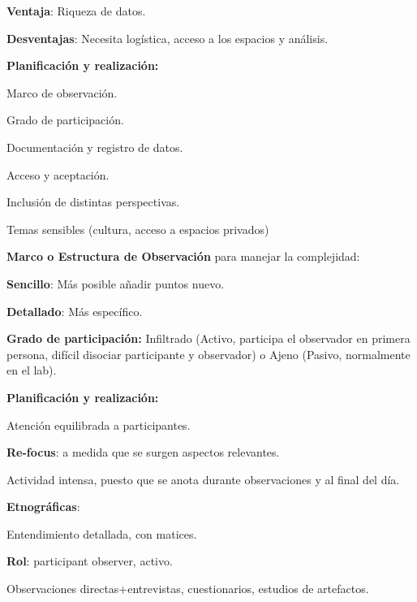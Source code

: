 \textbf{Ventaja}: Riqueza de datos.

\textbf{Desventajas}: Necesita logística, acceso a los espacios y
análisis.

\textbf{Planificación y realización:}

\hspace{0pt} Marco de observación.

\hspace{0pt} Grado de participación.

\hspace{0pt} Documentación y registro de datos.

\hspace{0pt} Acceso y aceptación.

\hspace{0pt} Inclusión de distintas perspectivas.

\hspace{0pt} Temas sensibles (cultura, acceso a espacios privados)

\textbf{Marco o Estructura de Observación} para manejar la complejidad:

\hspace{0pt} \textbf{Sencillo}: Más posible añadir puntos nuevo.

\hspace{0pt} \textbf{Detallado}: Más específico.

\textbf{Grado de participación:} Infiltrado (Activo, participa el
observador en primera persona, difícil disociar participante y
observador) o Ajeno (Pasivo, normalmente en el lab).

\textbf{Planificación y realización:}

\hspace{0pt} Atención equilibrada a participantes.

\hspace{0pt} \textbf{Re-focus}: a medida que se surgen aspectos
relevantes.

\hspace{0pt} Actividad intensa, puesto que se anota durante
observaciones y al final del día.

\textbf{Etnográficas}:

\hspace{0pt} Entendimiento detallada, con matices.

\hspace{0pt} \textbf{Rol}: participant observer, activo.

\hspace{0pt} Observaciones directas+entrevistas, cuestionarios, estudios
de artefactos.

